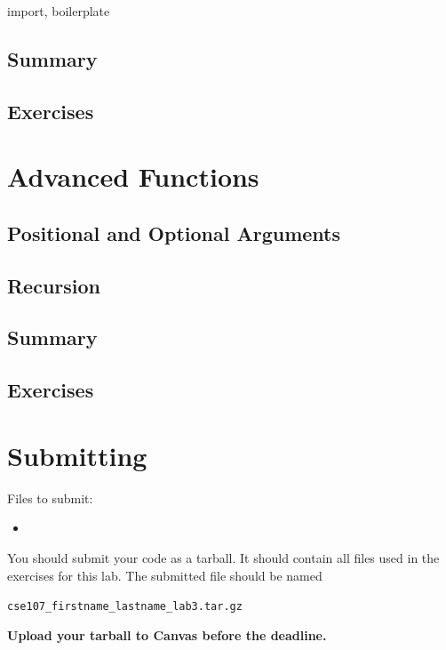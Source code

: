 \documentclass[11pt]{cselabheader}
\begin{document}
import, boilerplate

\subsection{Summary}
\label{subsec:modules.sum}

\subsection{Exercises}
\label{subsec:modules.ex}

\pagebreak
\section{Advanced Functions}
\label{sec:adv}

\subsection{Positional and Optional Arguments}
\label{subsec:adv.args}

\subsection{Recursion}
\label{subsec:adv.recursion}

\subsection{Summary}
\label{subsec:adv.sum}

\subsection{Exercises}
\label{subsec:adv.ex}

\pagebreak
\section{Submitting}

Files to submit:
\begin{itemize}
  \item 
\end{itemize}

You should submit your code as a tarball. It should contain all files
used in the exercises for this lab. The submitted file should be named
\begin{center}
  \texttt{cse107\_firstname\_lastname\_lab3.tar.gz}
\end{center}

\begin{center}
  \textbf{Upload your tarball to Canvas before the deadline.}
\end{center}
\end{document}
